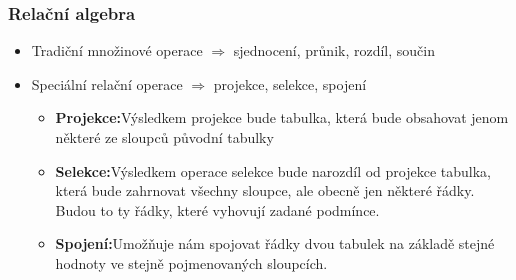 \documentclass[a4paper,10pt]{article}
\newcommand{\pojem}[2]{\item \textbf{#1:}\quad #2}
\newcommand{\tedy}{$\Rightarrow$ }
\begin{document}
			\subsubsection{Relační algebra}
				\begin{itemize}
					\item Tradiční množinové operace \tedy sjednocení, průnik, rozdíl, součin
					\item Speciální relační operace \tedy projekce, selekce, spojení
					\begin{itemize}
						\pojem{Projekce}{Výsledkem projekce bude tabulka, která bude obsahovat jenom některé ze sloupců původní tabulky}
						\pojem{Selekce}{Výsledkem operace selekce bude narozdíl od projekce tabulka, která bude zahrnovat všechny sloupce, ale obecně jen některé řádky. Budou to ty řádky, které vyhovují zadané podmínce.}
						\pojem{Spojení}{Umožňuje nám spojovat řádky dvou tabulek na základě stejné hodnoty ve stejně pojmenovaných sloupcích.}

					\end{itemize}
				\end{itemize}
		
\end{document}
